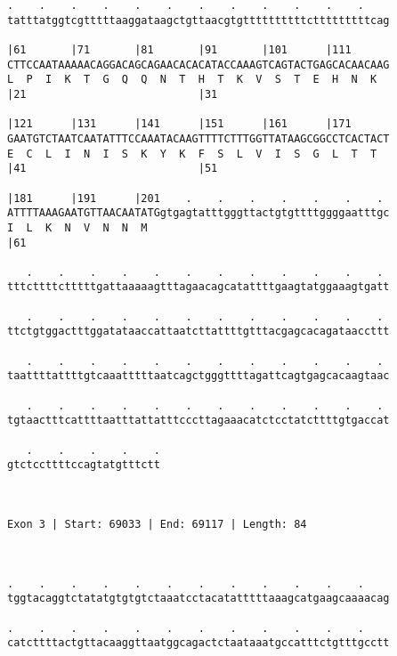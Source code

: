 \documentclass{article}
\begin{document}
\begin{Verbatim}
.    .    .    .    .    .    .    .    .    .    .    .    
tatttatggtcgtttttaaggataagctgttaacgtgttttttttttctttttttttcag
                                                            
|61       |71       |81       |91       |101      |111      
CTTCCAATAAAAACAGGACAGCAGAACACACATACCAAAGTCAGTACTGAGCACAACAAG
L  P  I  K  T  G  Q  Q  N  T  H  T  K  V  S  T  E  H  N  K  
|21                           |31                           
  
|121      |131      |141      |151      |161      |171      
GAATGTCTAATCAATATTTCCAAATACAAGTTTTCTTTGGTTATAAGCGGCCTCACTACT
E  C  L  I  N  I  S  K  Y  K  F  S  L  V  I  S  G  L  T  T  
|41                           |51                           
  
|181      |191      |201    .    .    .    .    .    .    . 
ATTTTAAAGAATGTTAACAATATGgtgagtatttgggttactgtgttttggggaatttgc
I  L  K  N  V  N  N  M                                      
|61                                                         
  
   .    .    .    .    .    .    .    .    .    .    .    . 
tttcttttctttttgattaaaaagtttagaacagcatattttgaagtatggaaagtgatt
                                                            
   .    .    .    .    .    .    .    .    .    .    .    . 
ttctgtggactttggatataaccattaatcttattttgtttacgagcacagataaccttt
                                                            
   .    .    .    .    .    .    .    .    .    .    .    . 
taattttattttgtcaaatttttaatcagctgggttttagattcagtgagcacaagtaac
                                                            
   .    .    .    .    .    .    .    .    .    .    .    . 
tgtaactttcattttaatttattatttcccttagaaacatctcctatcttttgtgaccat
                                                            
   .    .    .    .    .
gtctccttttccagtatgtttctt
                        
                        
 
Exon 3 | Start: 69033 | End: 69117 | Length: 84



.    .    .    .    .    .    .    .    .    .    .    .    
tggtacaggtctatatgtgtgtctaaatcctacatatttttaaagcatgaagcaaaacag
                                                            
.    .    .    .    .    .    .    .    .    .    .    .    
catcttttactgttacaaggttaatggcagactctaataaatgccatttctgtttgcctt
                                                            

\end{Verbatim}
\end{document}
